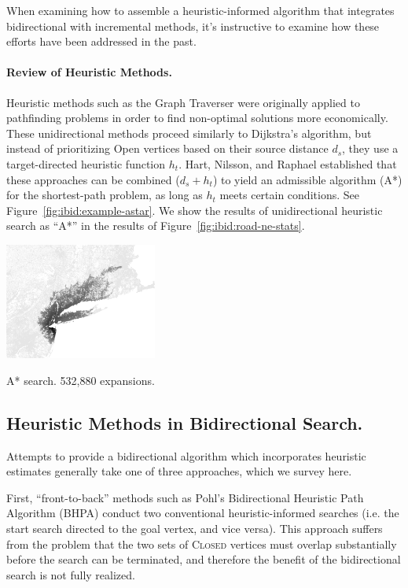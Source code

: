When examining how to assemble a heuristic-informed algorithm
that integrates bidirectional with incremental methods,
it's instructive to examine how these efforts have been addressed
in the past.

\paragraph{Review of Heuristic Methods.}
Heuristic methods such as the Graph Traverser
\citep{doran1966graphtraverser} were originally
applied to pathfinding problems in order to find non-optimal
solutions more economically.
These unidirectional methods proceed similarly to Dijkstra's algorithm,
but instead of prioritizing {\sc Open} vertices
based on their source distance $d_s$,
they use a target-directed heuristic function $h_t$.
Hart, Nilsson, and Raphael \citep{hart1968astar} established that
these approaches can be combined ($d_s + h_t$) to yield
an admissible algorithm (A*) for the shortest-path problem,
as long as $h_t$ meets certain conditions.
See Figure~\ref{fig:ibid:example-astar}.
We show the results of unidirectional heuristic search as ``A*''
in the results of Figure~\ref{fig:ibid:road-ne-stats}.

\begin{marginfigure}%
   \centering%
   \includegraphics[width=5cm]{figs/incbi-road-ne/singleshot/example-astar.png}%
   \caption{A* search.
      532,880 expansions.}%
   \label{fig:ibid:example-astar}%
\end{marginfigure}

\subsection{Heuristic Methods in Bidirectional Search.}
\label{subsec:ibid:heuristic-bidirectional}

Attempts to provide a bidirectional algorithm which incorporates
heuristic estimates generally take one of three approaches,
which we survey here.

First,
``front-to-back'' methods
such as Pohl's Bidirectional Heuristic Path Algorithm (BHPA)
\citep{pohl1971bidirectional}
conduct two conventional heuristic-informed searches
(i.e. the start search directed to the goal vertex,
and vice versa).
This approach suffers from the problem that the two sets of
\textsc{Closed} vertices must overlap substantially
before the search can be terminated,
and therefore the benefit of the bidirectional search
is not fully realized.

